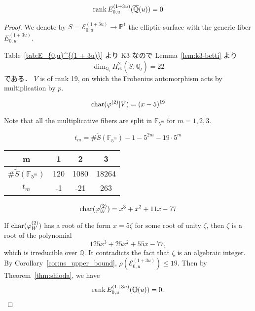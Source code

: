 \documentclass[main]{subfiles}
\begin{document}
\begin{thm}
    \begin{equation}
        \operatorname{rank} E_{0,u}^{(1 + 3u)}(\overline{\mathbb{Q}}(u)) = 0
    \end{equation}
\end{thm}
\begin{proof}
We denote by $S=\mathcal{E}_{0,u}^{(1 + 3u)} \to \mathbb{P}^1$ the elliptic surface with the generic fiber $E_{0,u}^{(1 + 3u)}$.

Table~\ref{tab:E_{0,u}^{(1 + 3u)}} より K3 なので Lemma~\ref{lem:k3-betti} より
\begin{equation}
    \dim_{\mathbb{Q}_{l}} H_{\text{\'et}}^{2}(\tilde{S}, \mathbb{Q}_{l}) = 22
\end{equation}
である．
$V$ is of rank 19, on which the Frobenius automorphism acts by multiplication by $p$.

\begin{equation}
    \operatorname{char} (\varphi^{(2)} | V) = (x - 5)^{19}
\end{equation}

Note that all the multiplicative fibers are split in $\mathbb{F}_{5^{m}}$ for $m=1,2,3$.

\begin{equation}
    t_{m} = \# \tilde{S}(\mathbb{F}_{5^{m}}) - 1 - 5^{2m} - 19 \cdot 5^{m}
\end{equation}

\begin{table}[h]
    \centering
    \begin{tabular}{|c|c|c|c|}
        \hline
        m                                & 1   & 2    & 3     \\
        \hline
        $\# \tilde{S}(\mathbb{F}_{5^m})$ & 120 & 1080 & 18264 \\
        \hline
        $t_m$                            & -1  & -21  & 263   \\
        \hline
    \end{tabular}
    \label{tab:sample}
\end{table}

\begin{equation}
    \operatorname{char}(\varphi_{W}^{(2)}) = x^{3} + x^{2} + 11 x - 77
\end{equation}

If $\operatorname{char} (\varphi_{W}^{(2)})$ has a root of the form $x=5\zeta$ for some root of unity $\zeta$, then $\zeta$ is a root of the polynomial
\begin{equation}
    125x^{3} + 25x^{2} + 55 x - 77,
\end{equation}
which is irreducible over $\mathbb{Q}$.
It contradicts the fact that $\zeta$ is an algebraic integer.
By Corollary~\ref{cor:ns_upper_bound}, $\rho(\mathcal{E}_{0,u}^{(1 + 3u)}) \leq 19$.
Then by Theorem~\ref{thm:shioda}, we have
\begin{equation}
    \operatorname{rank} E_{0,u}^{(1 + 3u)}(\overline{\mathbb{Q}}(u)) = 0.
\end{equation}

\end{proof}
\end{document}
